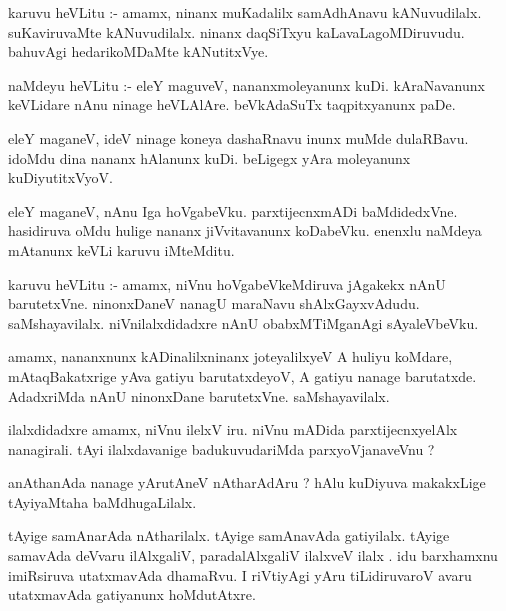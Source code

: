 \documentclass{article}
\begin{document}
\begin{mn}
karuvu  heVLitu :- amamx,  ninanx  muKadalilx  samAdhAnavu  kANuvudilalx.  suKaviruvaMte  
kANuvudilalx.  ninanx  daqSiTxyu  kaLavaLagoMDiruvudu.  bahuvAgi  hedarikoMDaMte  kANutitxVye.
\end{mn}

\begin{mn}
naMdeyu  heVLitu :- eleY  maguveV,  nananxmoleyanunx  kuDi.  kAraNavanunx  keVLidare  nAnu  
ninage  heVLAlAre.  beVkAdaSuTx  taqpitxyanunx  paDe.
\end{mn}

\begin{mn}
eleY  maganeV,  ideV  ninage  koneya  dashaRnavu  inunx  muMde  dulaRBavu.  idoMdu  dina  
nananx  hAlanunx  kuDi.  beLigegx  yAra  moleyanunx  kuDiyutitxVyoV.
\end{mn}

\begin{mn}
eleY  maganeV,  nAnu  Iga  hoVgabeVku.  parxtijecnxmADi  baMdidedxVne.  hasidiruva  oMdu  hulige  
nananx  jiVvitavanunx  koDabeVku.  enenxlu  naMdeya  mAtanunx  keVLi  karuvu  iMteMditu.
\end{mn}

\begin{mn}
karuvu  heVLitu :- amamx,  niVnu  hoVgabeVkeMdiruva  jAgakekx  nAnU  barutetxVne.  
ninonxDaneV  nanagU  maraNavu  shAlxGayxvAdudu.  saMshayavilalx.  niVnilalxdidadxre  
nAnU  obabxMTiMganAgi  sAyaleVbeVku.
\end{mn}

\begin{mn}
amamx,  nananxnunx  kADinalilxninanx  joteyalilxyeV  A  huliyu  koMdare,  mAtaqBakatxrige  
yAva gatiyu  barutatxdeyoV,  A gatiyu  nanage  barutatxde.  AdadxriMda  nAnU  ninonxDane  
barutetxVne.  saMshayavilalx.
\end{mn}

\begin{mn}
ilalxdidadxre  amamx,  niVnu  ilelxV  iru.  niVnu  mADida parxtijecnxyelAlx  
nanagirali.  tAyi  ilalxdavanige  badukuvudariMda  parxyoVjanaveVnu ?
\end{mn}

\begin{mn}
anAthanAda  nanage  yArutAneV  nAtharAdAru ?  hAlu  kuDiyuva  makakxLige  tAyiyaMtaha  baMdhugaLilalx.
\end{mn}

\begin{mn}
tAyige  samAnarAda  nAtharilalx.  tAyige  samAnavAda gatiyilalx.  tAyige  samavAda  deVvaru  
ilAlxgaliV,  paradalAlxgaliV  ilalxveV  ilalx .  idu  barxhamxnu  imiRsiruva  utatxmavAda  
dhamaRvu.  I  riVtiyAgi  yAru  tiLidiruvaroV  avaru  utatxmavAda  gatiyanunx  hoMdutAtxre.
\end{mn}
\end{document}
